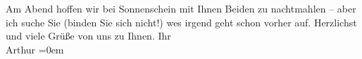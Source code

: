 \begin{ledgroupsized}[t]{13cm}
               Am Abend hoffen wir bei Sonnenschein mit Ihnen Beiden zu nachtmahlen – aber ich suche Sie (binden
               Sie sich nicht!) {\pb}we{\geminationn}s
               irgend geht schon vorher auf. Herzlichst und viele Grüße von uns zu Ihnen.\pend
           \pstart
           Ihr{\\[\baselineskip]}\spacefill\mbox{Arthur}\pend
           \leftskip=0em{}          \endnumbering{}\end{ledgroupsized}  \newcommand{\dateiname}{L02235}\newcommand{\titel}{Arthur Schnitzler an Richard Beer-Hofmann, 30. 7. 1916}\newcommand{\editorInnen}{Martin Anton Müller und Gerd-Hermann Susen}
            \footnotesize
\begin{ledgroupsized}[t]{11.5cm}
\end{ledgroupsized}
         
      